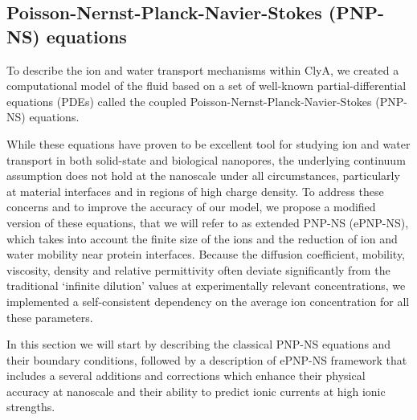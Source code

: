 \documentclass[journal=ancac3, manuscript=article, etalmode=truncate,maxauthors=0]{achemso}
\begin{document}




\subsection{Poisson-Nernst-Planck-Navier-Stokes (PNP-NS) equations}
To describe the ion and water transport mechanisms within ClyA, we created a computational model of the fluid
based on a set of well-known partial-differential equations (PDEs) called the coupled
Poisson-Nernst-Planck-Navier-Stokes (PNP-NS) equations. 

While these equations have proven to be excellent tool for studying ion and water transport in both 
solid-state\cite{daiguji2004,lu2012,chaudhry2014,rempfer2016,lin2016} and biological 
nanopores,\cite{eisenberg1996,simakov2010,pederson2015} the underlying continuum assumption does not hold at 
the nanoscale under all circumstances, particularly at material interfaces\cite{vo2016} and in regions of 
high charge density.\cite{corry2000} To address these concerns and to improve the accuracy of our model, we 
propose a modified version of these equations, that we will refer to as extended PNP-NS (ePNP-NS), which takes
into account the finite size of the ions\cite{borukhov1997,lu2011} and the reduction of ion and water mobility
near protein interfaces.\cite{makarov1998, pronk2013} Because the diffusion coefficient, mobility, viscosity,
density\cite{} and relative permittivity\cite{gavish2016} often deviate significantly from the traditional
`infinite dilution' values at experimentally relevant concentrations, we implemented a self-consistent
dependency on the average ion concentration for all these parameters.

In this section we will start by describing the classical PNP-NS equations and their boundary conditions,
followed by a description of ePNP-NS framework that includes a several additions and corrections which enhance
their physical accuracy at nanoscale and their ability to predict ionic currents at high ionic strengths.
\end{document}
